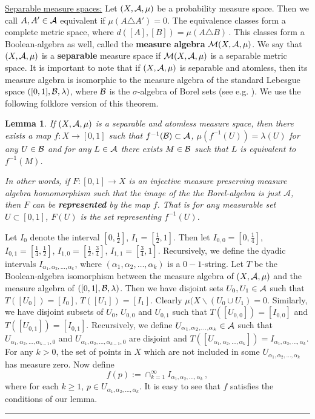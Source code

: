 \documentclass [11pt] {article}
\newcommand{\qed} {\hspace {0.1in} \rule {1.5mm} {3.5mm}}
\newtheorem{lemma}{Lemma}[section]
\def\proof{\smallskip\noindent{\it Proof.} }
\def\cA{\mbox{$\cal A$}}
\def\cB{\mbox{$\cal B$}}
\def\cA{\mbox{$\cal A$}}
\def\cB{\mbox{$\cal B$}}
\def\cM{\mbox{$\cal M$}}
\def\to{\rightarrow}
\begin{document}
\vskip 0.1in
\noindent
\underline{Separable measure spaces:}
Let $(X,\cA,\mu)$ be a probability measure space. Then we call $A,A'\in\cA$
equivalent if $\mu(A\triangle A')=0$. The equivalence classes form
a complete metric space, where $d([A],[B])=\mu(A\triangle B)\,.$
This classes form a Boolean-algebra as well, called the
{\bf measure algebra} $\cM(X,\cA,\mu)$. We say that $(X,\cA,\mu)$ is
a {\bf separable} measure space if
$\cM(X,\cA,\mu)$ is a separable metric
space. It is important to note that if $(X,\cA,\mu)$ is separable and atomless,
then its measure algebra is isomorphic to the measure algebra of
the standard Lebesgue space $([0,1],\cB,\lambda)$, where $\cB$ is
the $\sigma$-algebra of Borel sets (see e.g. \cite{Hal}).
We use the following folklore version of this
theorem.
\begin{lemma} \label{measurealgebra}
If $(X,\cA,\mu)$ is a separable and atomless measure space, then there
exists a map $f:X\to [0,1]$ such that
 $f^{-1}(\cB)\subset \cA$,
$\mu(f^{-1}(U))=\lambda(U)$ for any $U\in \cB$ and
for any $L\in\cA$ there exists
$M\in\cB$ such that $L$ is equivalent to $f^{-1}(M)$.

\noindent
In other words, if $F:[0,1]\to X$ is an injective measure preserving
measure algebra homomorphism
such that the image of the the Borel-algebra is just $\mathcal{A}$, then
$F$ can be {\bf represented} by the map $f$. That is for any 
measurable set $U\subset [0,1]$, $F(U)$ is the set representing $f^{-1}(U)$.
\end{lemma}
\proof
Let $I_0$ denote the interval $[0,\frac{1}{2}]$, $I_1=[\frac{1}{2},1]$.
Then let $I_{0,0}=[0,\frac{1}{4}]$, $I_{0,1}=[\frac{1}{4},\frac{1}{2}]$,
$I_{1,0}=[\frac{1}{2},\frac{3}{4}]$, $I_{1,1}=[\frac{3}{4},1]$.
Recursively, we define the dyadic intervals $I_{\alpha_1,\alpha_2,\dots,
\alpha_k}$, where $(\alpha_1,\alpha_2,\dots,
\alpha_k)$ is a $0-1$-string.
Let $T$ be the Boolean-algebra isomorphism between the measure algebra
of $(X,\cA,\mu)$ and the measure algebra of $([0,1],\cB,\lambda)$.
Then we have disjoint sets $U_0, U_1\in\cA$ such that
$T([U_0])=[I_0]$, $T([U_1])=[I_1]$. Clearly $\mu(X\backslash (U_0\cup U_1)=0$.
Similarly, we have disjoint subsets of $U_0$, $U_{0,0}$ and $U_{0,1}$
such that $T([U_{0,0}])=[I_{0,0}]$ and $T([U_{0,1}])=[I_{0,1}]$.
Recursively, we define $U_{\alpha_1,\alpha_2,\dots,
\alpha_k}\in \cA$ such that
$U_{\alpha_1,\alpha_2,\dots,
\alpha_{k-1},0}$ and $U_{\alpha_1,\alpha_2,\dots,
\alpha_{k-1},0}$ are disjoint and $T([U_{\alpha_1,\alpha_2,\dots,
\alpha_k}])= I_{\alpha_1,\alpha_2,\dots,
\alpha_k}$. For any $k>0$, the set of points in $X$ which are not
included in some
$U_{\alpha_1,\alpha_2,\dots,
\alpha_k}$ has measure zero.
Now define
$$f(p):=\cap^\infty_{k=1} I_{\alpha_1,\alpha_2,\dots,
\alpha_k}\,,$$
where for each $k\geq 1$, $p\in U_{\alpha_1,\alpha_2,\dots,
\alpha_k}$. It is easy to see that $f$ satisfies the conditions
of our lemma. \qed
\end{document}
